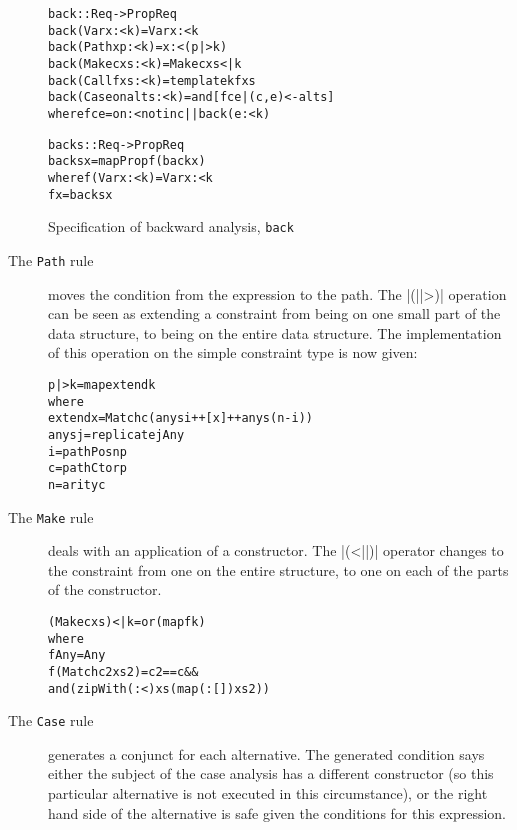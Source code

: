 \documentclass[preprint]{sigplanconf}
\newcommand{\T}[1]{\texttt{#1}}
\newenvironment{code}{\begin{alltt}\small}{\end{alltt}}
\begin{document}
\begin{figure}
\begin{code}
back :: Req -> Prop Req
back (Var x         :< k) = Var x :< k
back (Path x p      :< k) = x :< (p |> k)
back (Make c xs     :< k) = Make c xs <| k
back (Call f xs     :< k) = template k f xs
back (Case on alts  :< k) = and [f c e | (c,e) <- alts]
    where f c e = on :< notin c || back (e :< k)

backs :: Req -> Prop Req
backs x = mapProp f (back x)
    where f (Var x :< k) = Var x :< k
          f x = backs x
\end{code}
\caption{Specification of backward analysis, \T{back}}
\label{fig:backward}
\end{figure}

\begin{description}

\item[The \T{Path} rule] moves the condition from the expression to the path. The |(||>)| operation can be seen as extending a constraint from being on one small part of the data structure, to being on the entire data structure. The implementation of this operation on the simple constraint type is now given:

\begin{code}
p |> k = map extend k
    where
    extend x = Match c (anys i ++ [x] ++ anys (n-i))
    anys j = replicate j Any
    i = pathPosn p
    c = pathCtor p
    n = arity c
\end{code}

\item[The \T{Make} rule] deals with an application of a constructor. The |(<||)| operator changes to the constraint from one on the entire structure, to one on each of the parts of the constructor.

\begin{code}
(Make c xs) <| k = or (map f k)
    where
    f Any = Any
    f (Match c2 xs2) = c2 == c &&
        and (zipWith (:<) xs (map (:[]) xs2))
\end{code}


\item[The \T{Case} rule] generates a conjunct for each alternative. The generated condition says either the subject of the case analysis has a different constructor (so this particular alternative is not executed in this circumstance), or the right hand side of the alternative is safe given the conditions for this expression.
\end{description}
\end{document}
